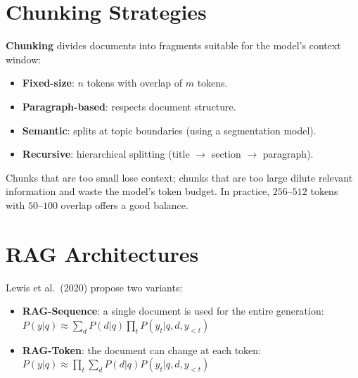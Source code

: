 \section{Chunking Strategies}
\label{sec:rag:chunking}

\begin{definition}
\textbf{Chunking} divides documents into fragments suitable for the
model's context window:
\begin{itemize}
    \item \textbf{Fixed-size}: $n$ tokens with overlap of $m$ tokens.
    \item \textbf{Paragraph-based}: respects document structure.
    \item \textbf{Semantic}: splits at topic boundaries (using a
    segmentation model).
    \item \textbf{Recursive}: hierarchical splitting
    (title $\to$ section $\to$ paragraph).
\end{itemize}
\end{definition}

\begin{warning}[title=\textbf{Chunk Size Trade-off}]
Chunks that are too small lose context; chunks that are too large dilute
relevant information and waste the model's token budget. In practice,
$256$--$512$ tokens with $50$--$100$ overlap offers a good balance.
\end{warning}

\section{RAG Architectures}
\label{sec:rag:architectures}

\begin{definition}
Lewis et al.\ (2020) propose two variants:
\begin{itemize}
    \item \textbf{RAG-Sequence}: a single document is used for the entire
    generation:
    $P(y|q) \approx \sum_{d} P(d|q) \prod_t P(y_t | q, d, y_{<t})$
    \item \textbf{RAG-Token}: the document can change at each token:
    $P(y|q) \approx \prod_t \sum_{d} P(d|q) P(y_t | q, d, y_{<t})$
\end{itemize}
\end{definition}

